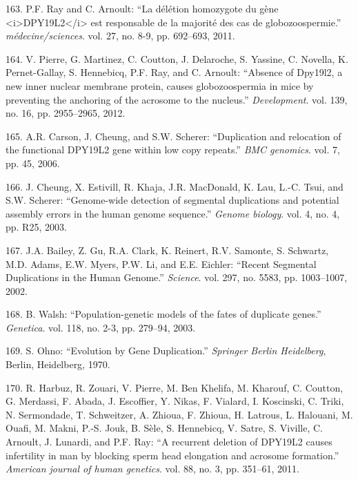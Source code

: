 \documentclass[12pt,twoside]{reedthesis}
\theoremstyle{definition}
\theoremstyle{definition}
\theoremstyle{remark}
\begin{document}
  \hypertarget{ref-Ray2011}{}
  163. P.F. Ray and C. Arnoult: ``La délétion homozygote du gène
  \textless{}i\textgreater{}DPY19L2\textless{}/i\textgreater{} est
  responsable de la majorité des cas de globozoospermie.''
  \emph{médecine/sciences}. vol. 27, no. 8-9, pp. 692--693, 2011.
  
  \hypertarget{ref-Pierre2012}{}
  164. V. Pierre, G. Martinez, C. Coutton, J. Delaroche, S. Yassine, C.
  Novella, K. Pernet-Gallay, S. Hennebicq, P.F. Ray, and C. Arnoult:
  ``Absence of Dpy19l2, a new inner nuclear membrane protein, causes
  globozoospermia in mice by preventing the anchoring of the acrosome to
  the nucleus.'' \emph{Development}. vol. 139, no. 16, pp. 2955--2965,
  2012.
  
  \hypertarget{ref-Carson2006}{}
  165. A.R. Carson, J. Cheung, and S.W. Scherer: ``Duplication and
  relocation of the functional DPY19L2 gene within low copy repeats.''
  \emph{BMC genomics}. vol. 7, pp. 45, 2006.
  
  \hypertarget{ref-Cheung2003}{}
  166. J. Cheung, X. Estivill, R. Khaja, J.R. MacDonald, K. Lau, L.-C.
  Tsui, and S.W. Scherer: ``Genome-wide detection of segmental
  duplications and potential assembly errors in the human genome
  sequence.'' \emph{Genome biology}. vol. 4, no. 4, pp. R25, 2003.
  
  \hypertarget{ref-Bailey2002}{}
  167. J.A. Bailey, Z. Gu, R.A. Clark, K. Reinert, R.V. Samonte, S.
  Schwartz, M.D. Adams, E.W. Myers, P.W. Li, and E.E. Eichler: ``Recent
  Segmental Duplications in the Human Genome.'' \emph{Science}. vol. 297,
  no. 5583, pp. 1003--1007, 2002.
  
  \hypertarget{ref-Walsh2003}{}
  168. B. Walsh: ``Population-genetic models of the fates of duplicate
  genes.'' \emph{Genetica}. vol. 118, no. 2-3, pp. 279--94, 2003.
  
  \hypertarget{ref-Ohno1970}{}
  169. S. Ohno: ``Evolution by Gene Duplication.'' \emph{Springer Berlin
  Heidelberg}, Berlin, Heidelberg, 1970.
  
  \hypertarget{ref-Harbuz2011a}{}
  170. R. Harbuz, R. Zouari, V. Pierre, M. Ben Khelifa, M. Kharouf, C.
  Coutton, G. Merdassi, F. Abada, J. Escoffier, Y. Nikas, F. Vialard, I.
  Koscinski, C. Triki, N. Sermondade, T. Schweitzer, A. Zhioua, F. Zhioua,
  H. Latrous, L. Halouani, M. Ouafi, M. Makni, P.-S. Jouk, B. Sèle, S.
  Hennebicq, V. Satre, S. Viville, C. Arnoult, J. Lunardi, and P.F. Ray:
  ``A recurrent deletion of DPY19L2 causes infertility in man by blocking
  sperm head elongation and acrosome formation.'' \emph{American journal
  of human genetics}. vol. 88, no. 3, pp. 351--61, 2011.
  
\end{document}
